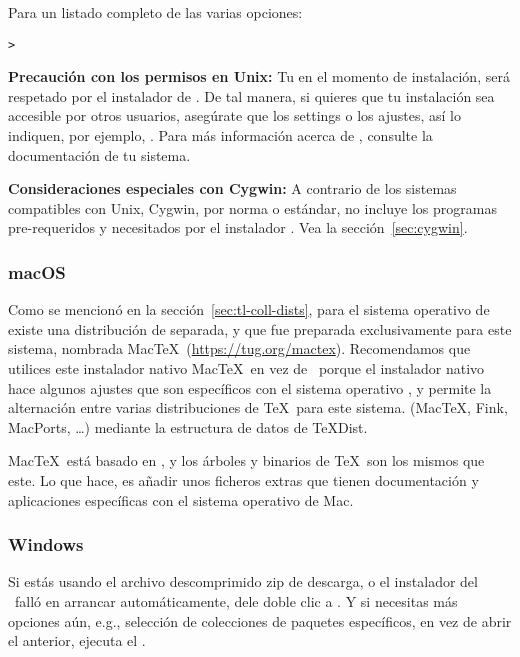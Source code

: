\documentclass{article}
\begin{document}
Para un listado completo de las varias opciones:
\begin{alltt}
> 
\end{alltt}

\textbf{Precaución con los permisos en Unix:} Tu  en el
momento de instalación, será respetado por el instalador de \TL{}. De
tal manera, si quieres que tu instalación sea accesible por otros
usuarios, asegúrate que los settings o los ajustes, así lo
indiquen, por ejemplo, . Para más
información acerca de 
, consulte la documentación de tu sistema. 

\textbf{Consideraciones especiales con Cygwin:} A contrario de los
sistemas compatibles con Unix, Cygwin, por norma o estándar, no
incluye los programas pre-requeridos y necesitados por el instalador
\TL{}. Vea la sección~\ref{sec:cygwin}.

\subsubsection{macOS}
\label{sec:macosx}

Como se mencionó en la sección~\ref{sec:tl-coll-dists}, para el
sistema operativo de \macOS existe una distribución de \TL{} separada, 
y que fue preparada exclusivamente para este sistema, nombrada
Mac\TeX\ (\url{https://tug.org/mactex}).  Recomendamos que utilices
este instalador nativo Mac\TeX\ en vez de \TL\, porque el instalador
nativo hace algunos ajustes que son específicos con el sistema
operativo \macOS, y permite la alternación entre varias
distribuciones de \TeX\ para este sistema. (Mac\TeX, Fink, MacPorts,
\ldots) mediante la estructura de datos de \TeX{}Dist.

Mac\TeX\ está basado en \TL, y los árboles y binarios de \TeX\ son los mismos que
este. Lo que hace, es añadir unos ficheros extras que tienen documentación y
aplicaciones específicas con el sistema operativo de Mac.

\subsubsection{Windows}\label{sec:wininst}

Si estás usando el archivo descomprimido zip de descarga, o el
instalador del \DVD\ falló en arrancar automáticamente, dele doble
clic a . Y si necesitas más opciones
aún, e.g., selección de colecciones de paquetes específicos, en vez de
abrir el anterior, ejecuta el . 
\end{document}
